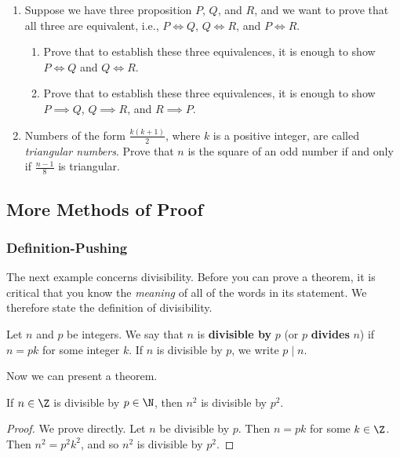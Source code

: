 \begin{enumerate}
    \item Suppose we have three proposition $P$, $Q$, and $R$, and we want to prove that all three are equivalent, i.e., $P \iff Q$, $Q \iff R$, and $P \iff R$.
    \begin{enumerate}
        \item Prove that to establish these three equivalences, it is enough to show $P \iff Q$ and $Q \iff R$.
        \item Prove that to establish these three equivalences, it is enough to show $P \implies Q$, $Q \implies R$, and $R \implies P$.
    \end{enumerate}
    
    \item Numbers of the form $\frac{k(k + 1)}{2}$, where $k$ is a positive integer, are called \emph{triangular numbers}. Prove that $n$ is the square of an odd number if and only if $\frac{n-1}{8}$ is triangular. 
	
	
\end{enumerate}
\newpage 

\subsection{More Methods of Proof}

\subsubsection*{Definition-Pushing}

The next example concerns divisibility. Before you can prove a theorem, it is critical that you know the \emph{meaning} of all of the words in its statement. We therefore state the definition of divisibility.

\begin{defn}
Let $n$ and $p$ be integers. We say that $n$ is \textbf{divisible by} $p$ (or $p$ \textbf{divides} $n$) if $n = pk$ for some integer $k$. If $n$ is divisible by $p$, we write $p \mid n$.
\end{defn}

\noindent Now we can present a theorem.

\begin{thm}
If $n\in\Z$ is divisible by $p\in\N$, then $n^2$ is divisible by $p^2$.
\end{thm}

\begin{proof}
We prove directly. Let $n$ be divisible by $p$. Then $n=pk$ for some $k\in\Z$. Then $n^2=p^2k^2$, and so $n^2$ is divisible by $p^2$.
\end{proof}

